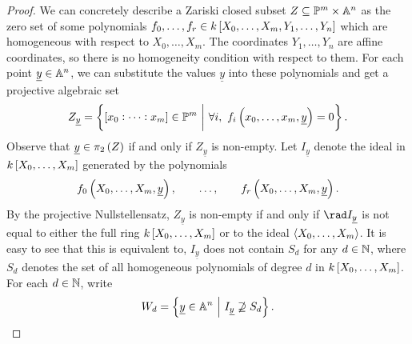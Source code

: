 \begin{proof}
We can concretely describe a Zariski closed subset $ Z \subseteq \PP^m \times \AA^n $ as the zero set of some polynomials $ f_0, \dots, f_r \in k\sbr{X_0, \dots, X_m, Y_1, \dots, Y_n} $ which are homogeneous with respect to $ X_0, \dots, X_m $. The coordinates $ Y_1, \dots, Y_n $ are affine coordinates, so there is no homogeneity condition with respect to them. For each point $ \underline{y} \in \AA^n $, we can substitute the values $ \underline{y} $ into these polynomials and get a projective algebraic set
$$ Z_{\underline{y}} = \cbr{\sbr{x_0 : \dots : x_m} \in \PP^m \st \forall i, \ f_i\br{x_0, \dots, x_m, \underline{y}} = 0}. $$
Observe that $ \underline{y} \in \pi_2\br{Z} $ if and only if $ Z_{\underline{y}} $ is non-empty. Let $ I_{\underline{y}} $ denote the ideal in $ k\sbr{X_0, \dots, X_m} $ generated by the polynomials
$$ f_0\br{X_0, \dots, X_m, \underline{y}}, \qquad \dots, \qquad f_r\br{X_0, \dots, X_m, \underline{y}}. $$
By the projective Nullstellensatz, $ Z_{\underline{y}} $ is non-empty if and only if $ \rad I_{\underline{y}} $ is not equal to either the full ring $ k\sbr{X_0, \dots, X_m} $ or to the ideal $ \abr{X_0, \dots, X_m} $. It is easy to see that this is equivalent to, $ I_{\underline{y}} $ does not contain $ S_d $ for any $ d \in \NN $, where $ S_d $ denotes the set of all homogeneous polynomials of degree $ d $ in $ k\sbr{X_0, \dots, X_m} $. For each $ d \in \NN $, write
$$ W_d = \cbr{\underline{y} \in \AA^n \st I_{\underline{y}} \not\supseteq S_d}. $$

\pagebreak


\end{proof}

